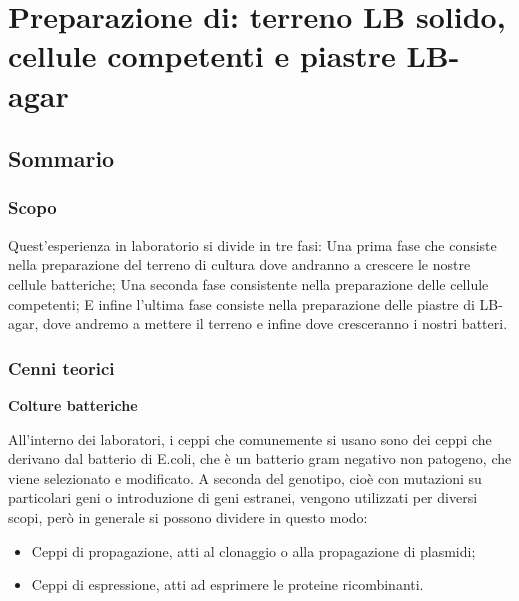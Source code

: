 \section{\LARGE{Preparazione di:  terreno LB solido, cellule competenti e piastre LB-agar }}

\vspace{0.6cm}


\subsection{Sommario}

\subsubsection{Scopo}

Quest'esperienza in laboratorio si divide in tre fasi: Una prima fase che consiste nella preparazione del terreno di cultura dove andranno a crescere le nostre cellule batteriche; Una seconda fase consistente nella preparazione delle cellule competenti; E infine l'ultima fase consiste nella preparazione delle piastre di LB-agar, dove andremo a mettere il terreno e infine dove cresceranno i nostri batteri.


\subsubsection{Cenni teorici}

\textbf{Colture batteriche}
\vspace{0.3cm}

All'interno dei laboratori, i ceppi che comunemente si usano sono dei ceppi che derivano dal batterio di E.coli, che è un batterio gram negativo non patogeno, che viene selezionato e modificato.
A seconda del genotipo, cioè con mutazioni su particolari geni o introduzione di geni estranei, vengono utilizzati per diversi scopi, però in generale si possono dividere in questo modo:
\begin{itemize}
  \item Ceppi di propagazione, atti al clonaggio o alla propagazione di plasmidi;

  \item Ceppi di espressione, atti ad esprimere le proteine ricombinanti.

\end{itemize}

